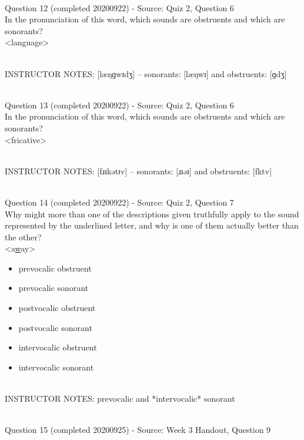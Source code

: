 \documentclass[12pt]{article}
\begin{document}
~\\

{\large Question 12} (completed 20200922) - Source: Quiz 2, Question 6\\

In the pronunciation of this word, which sounds are obstruents and which are sonorants?\\

<language>


~\\
INSTRUCTOR NOTES: [læŋɡwɪdʒ] -- sonorants: [læŋwɪ] and obstruents: [ɡdʒ]


~\\

{\large Question 13} (completed 20200922) - Source: Quiz 2, Question 6\\

In the pronunciation of this word, which sounds are obstruents and which are sonorants?\\

<fricative>


~\\
INSTRUCTOR NOTES: [fɹɪkətɪv] -- sonorants: [ɹɪəɪ] and obstruents: [fktv]


~\\

{\large Question 14} (completed 20200922) - Source: Quiz 2, Question 7\\

Why might more than one of the descriptions given truthfully apply to the sound represented by the underlined letter, and why is one of them actually better than the other?\\

<a\underline{w}ay>

\begin{itemize} \item prevocalic obstruent \item prevocalic sonorant \item postvocalic obstruent \item postvocalic sonorant \item intervocalic obstruent \item intervocalic sonorant \end{itemize}


~\\
INSTRUCTOR NOTES: prevocalic and *intervocalic* sonorant


~\\

{\large Question 15} (completed 20200925) - Source: Week 3 Handout, Question 9\\
\end{document}
